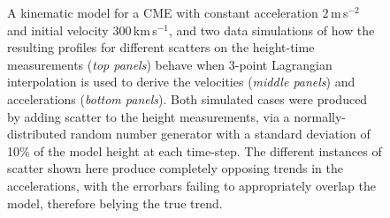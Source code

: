 \documentclass[structabstract]{aa}
\begin{document}
\begin{figure}[!t]
\caption{A kinematic model for a CME with constant acceleration $2$\,m\,s$^{-2}$ and initial velocity $300$\,km\,s$^{-1}$, and two data simulations of how the resulting profiles for different scatters on the height-time measurements (\emph{top panels}) behave when 3-point Lagrangian interpolation is used to derive the velocities (\emph{middle panels}) and accelerations (\emph{bottom panels}). Both simulated cases were produced by adding scatter to the height measurements, via a normally-distributed random number generator with a standard deviation of 10\% of the model height at each time-step. The different instances of scatter shown here produce completely opposing trends in the accelerations, with the errorbars failing to appropriately overlap the model, therefore belying the true trend.}
\label{sim_vels_thesis}
\end{figure}
 
\end{document}
